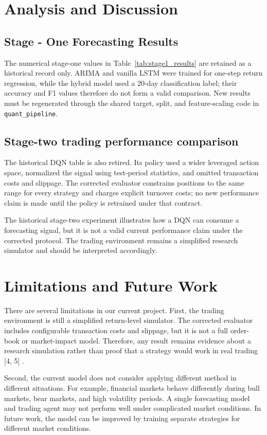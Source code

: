 \documentclass{article}
\begin{document}
\section{Analysis and Discussion}
\subsection{Stage - One Forecasting Results}
The numerical stage-one values in Table~\ref{tab:stage1_results} are retained as a historical record only. ARIMA and vanilla LSTM were trained for one-step return regression, while the hybrid model used a 20-day classification label; their accuracy and F1 values therefore do not form a valid comparison. New results must be regenerated through the shared target, split, and feature-scaling code in \texttt{quant\_pipeline}.

\subsection{Stage-two trading performance comparison}
The historical DQN table is also retired. Its policy used a wider leveraged action space, normalized the signal using test-period statistics, and omitted transaction costs and slippage. The corrected evaluator constrains positions to the same range for every strategy and charges explicit turnover costs; no new performance claim is made until the policy is retrained under that contract.

The historical stage-two experiment illustrates how a DQN can consume a forecasting signal, but it is not a valid current performance claim under the corrected protocol. The trading environment remains a simplified research simulator and should be interpreted accordingly.

\section{Limitations and Future Work}

There are several limitations in our current project. First, the trading environment is still a simplified return-level simulator. The corrected evaluator includes configurable transaction costs and slippage, but it is not a full order-book or market-impact model. Therefore, any result remains evidence about a research simulation rather than proof that a strategy would work in real trading [4, 5] .

Second, the current model does not consider applying different method in different situations. For example, financial markets behave differently during bull markets, bear markets, and high volatility periods. A single forecasting model and trading agent may not perform well under complicated market conditions. In future work, the model can be improved by training separate strategies for different market conditions.
\end{document}
